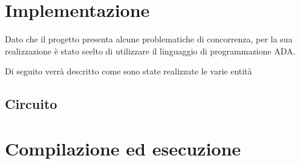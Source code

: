 \documentclass[a4paper,11pt, twoside]{book}
\begin{document}
  \chapter{Implementazione}
    Dato che il progetto presenta alcune problematiche di concorrenza, per la sua realizzazione è stato scelto
    di utilizzare il linguaggio di programmazione ADA.
    
    Di seguito verrà descritto come sono state realizzate le varie entità
    
    \section{Circuito}
      
  
  \chapter{Compilazione ed esecuzione}
\end{document}
